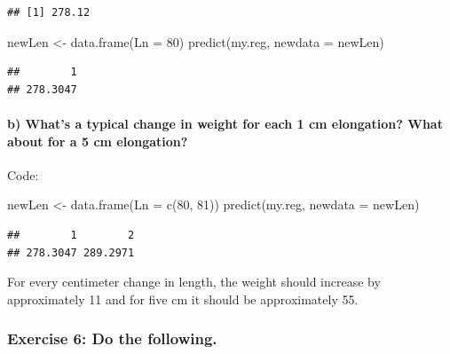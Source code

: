 \documentclass[
]{article}
\newenvironment{Shaded}{\begin{snugshade}}{\end{snugshade}}
\newcommand{\AttributeTok}[1]{\textcolor[rgb]{0.77,0.63,0.00}{#1}}
\newcommand{\DecValTok}[1]{\textcolor[rgb]{0.00,0.00,0.81}{#1}}
\newcommand{\FunctionTok}[1]{\textcolor[rgb]{0.00,0.00,0.00}{#1}}
\newcommand{\NormalTok}[1]{#1}
\newcommand{\OtherTok}[1]{\textcolor[rgb]{0.56,0.35,0.01}{#1}}
\begin{document}
\begin{verbatim}
## [1] 278.12
\end{verbatim}

\begin{Shaded}
\begin{Highlighting}[]
\NormalTok{newLen }\OtherTok{\textless{}{-}} \FunctionTok{data.frame}\NormalTok{(}\AttributeTok{Ln =} \DecValTok{80}\NormalTok{)}
\FunctionTok{predict}\NormalTok{(my.reg, }\AttributeTok{newdata =}\NormalTok{ newLen)}
\end{Highlighting}
\end{Shaded}

\begin{verbatim}
##        1 
## 278.3047
\end{verbatim}

\hypertarget{b-whats-a-typical-change-in-weight-for-each-1-cm-elongation-what-about-for-a-5-cm-elongation}{%
\paragraph{b) What's a typical change in weight for each 1 cm
elongation? What about for a 5 cm
elongation?}\label{b-whats-a-typical-change-in-weight-for-each-1-cm-elongation-what-about-for-a-5-cm-elongation}}

\hfill\break
Code:

\begin{Shaded}
\begin{Highlighting}[]
\NormalTok{newLen }\OtherTok{\textless{}{-}} \FunctionTok{data.frame}\NormalTok{(}\AttributeTok{Ln =} \FunctionTok{c}\NormalTok{(}\DecValTok{80}\NormalTok{, }\DecValTok{81}\NormalTok{))}
\FunctionTok{predict}\NormalTok{(my.reg, }\AttributeTok{newdata =}\NormalTok{ newLen)}
\end{Highlighting}
\end{Shaded}

\begin{verbatim}
##        1        2 
## 278.3047 289.2971
\end{verbatim}

For every centimeter change in length, the weight should increase by
approximately 11 and for five cm it should be approximately 55.

\hypertarget{exercise-6-do-the-following.}{%
\subsubsection{Exercise 6: Do the
following.}\label{exercise-6-do-the-following.}}
\end{document}
